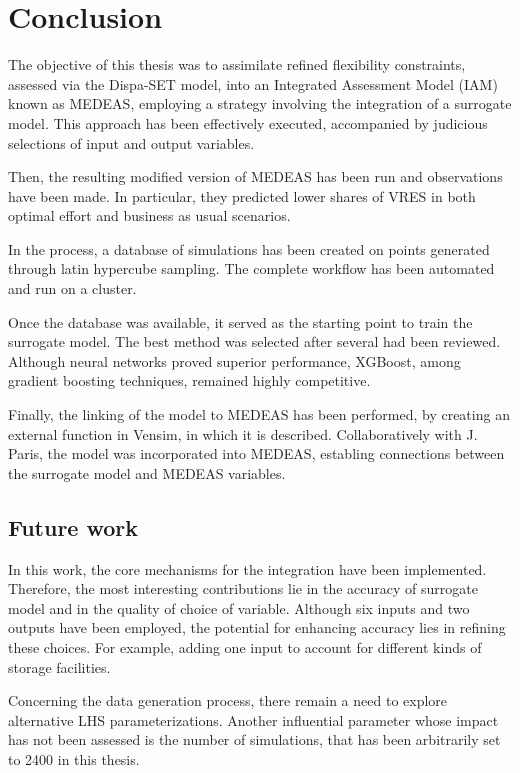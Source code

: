 \section{Conclusion}

The objective of this thesis was to assimilate refined flexibility constraints, assessed via the Dispa-SET model, into an Integrated Assessment Model (IAM) known as MEDEAS, employing a strategy involving the integration of a surrogate model. This approach has been effectively executed, accompanied by judicious selections of input and output variables.

Then, the resulting modified version of MEDEAS has been run and observations have been made. In particular, they predicted lower shares of VRES in both optimal effort and business as usual scenarios.

In the process, a database of simulations has been created on points generated through latin hypercube sampling. The complete workflow has been automated and run on a cluster.

Once the database was available, it served as the starting point to train the surrogate model. The best method was selected after several had been reviewed. Although neural networks proved superior performance, XGBoost, among gradient boosting techniques, remained highly competitive.

Finally, the linking of the model to MEDEAS has been performed, by creating an external function in Vensim, in which it is described. Collaboratively with J. Paris, the model was incorporated into MEDEAS, establing connections between the surrogate model and MEDEAS variables.

\subsection{Future work}

In this work, the core mechanisms for the integration have been implemented. Therefore, the most interesting contributions lie in the accuracy of surrogate model and in the quality of choice of variable. Although six inputs and two outputs have been employed, the potential for enhancing accuracy lies in refining these choices. For example, adding one input to account for different kinds of storage facilities.

Concerning the data generation process, there remain a need to explore alternative LHS parameterizations. Another influential parameter whose impact has not been assessed is the number of simulations, that has been arbitrarily set to 2400 in this thesis.

